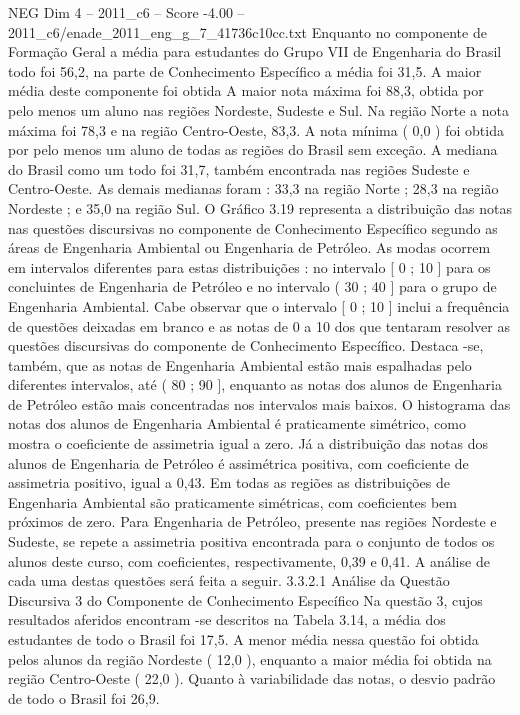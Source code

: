 \begin{textsample}{NEG Dim 4 – 2011\_c6 – Score -4.00 – 2011\_c6/enade\_2011\_eng\_g\_7\_41736c10cc.txt}
Enquanto no componente de Formação Geral a média para estudantes do Grupo VII de Engenharia do Brasil todo foi 56,2, na parte de Conhecimento Específico a média foi 31,5.
A maior média deste componente foi obtida A maior nota máxima foi 88,3, obtida por pelo menos um aluno nas regiões Nordeste, Sudeste e Sul.
Na região Norte a nota máxima foi 78,3 e na região Centro-Oeste, 83,3.
A nota mínima ( 0,0 ) foi obtida por pelo menos um aluno de todas as regiões do Brasil sem exceção.
A mediana do Brasil como um todo foi 31,7, também encontrada nas regiões Sudeste e Centro-Oeste.
As demais medianas foram : 33,3 na região Norte ; 28,3 na região Nordeste ; e 35,0 na região Sul.
O Gráfico 3.19 representa a distribuição das notas nas questões discursivas no componente de Conhecimento Específico segundo as áreas de Engenharia Ambiental ou Engenharia de Petróleo.
As modas ocorrem em intervalos diferentes para estas distribuições : no intervalo [ 0 ; 10 ] para os concluintes de Engenharia de Petróleo e no intervalo ( 30 ; 40 ] para o grupo de Engenharia Ambiental.
Cabe observar que o intervalo [ 0 ; 10 ] inclui a frequência de questões deixadas em branco e as notas de 0 a 10 dos que tentaram resolver as questões discursivas do componente de Conhecimento Específico.
Destaca -se, também, que as notas de Engenharia Ambiental estão mais espalhadas pelo diferentes intervalos, até ( 80 ; 90 ], enquanto as notas dos alunos de Engenharia de Petróleo estão mais concentradas nos intervalos mais baixos.
O histograma das notas dos alunos de Engenharia Ambiental é praticamente simétrico, como mostra o coeficiente de assimetria igual a zero.
Já a distribuição das notas dos alunos de Engenharia de Petróleo é assimétrica positiva, com coeficiente de assimetria positivo, igual a 0,43.
Em todas as regiões as distribuições de Engenharia Ambiental são praticamente simétricas, com coeficientes bem próximos de zero.
Para Engenharia de Petróleo, presente nas regiões Nordeste e Sudeste, se repete a assimetria positiva encontrada para o conjunto de todos os alunos deste curso, com coeficientes, respectivamente, 0,39 e 0,41.
A análise de cada uma destas questões será feita a seguir. 3.3.2.1 Análise da Questão Discursiva 3 do Componente de Conhecimento Específico Na questão 3, cujos resultados aferidos encontram -se descritos na Tabela 3.14, a média dos estudantes de todo o Brasil foi 17,5.
A menor média nessa questão foi obtida pelos alunos da região Nordeste ( 12,0 ), enquanto a maior média foi obtida na região Centro-Oeste ( 22,0 ).
Quanto à variabilidade das notas, o desvio padrão de todo o Brasil foi 26,9.

\end{textsample}
